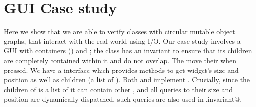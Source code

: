 \saveSpace
\section{GUI Case study}
\label{s:patterns}
\saveSpace

%
%
%
%
%
%
%
Here we show that we are able to verify classes with circular mutable object graphs, that interact with the real world using I/O.
Our case study involves a GUI with containers (\Q@SafeMovable@s) and \Q@Button@s;
the \Q@SafeMovable@ class has an invariant to ensure that its children are completely contained within it and do not overlap. The \Q@Button@s move their \Q@SafeMovable@ when pressed. We have a \Q@Widget@ interface which provides methods to get widget's size and position as well as children (a list of \Q@Widget@s). Both \Q@SafeMovable@s and \Q@Button@s implement \Q@Widget@. Crucially, since the children of \Q@SafeMovable@ is a list of \Q@Widget@s it can contain other \Q@SafeMovable@s, and all queries to their size and position are dynamically dispatched, such queries are also used in \Q@SafeMovable.invariant@.

